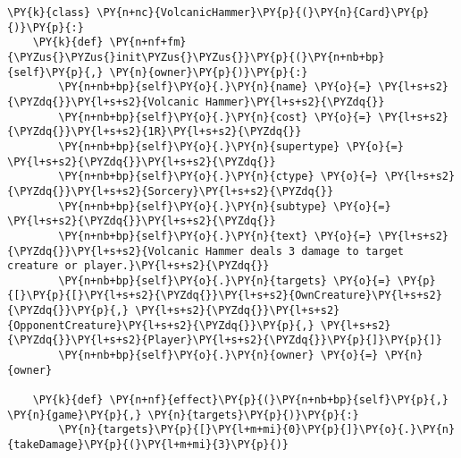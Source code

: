 \begin{Verbatim}[commandchars=\\\{\}]
\PY{k}{class} \PY{n+nc}{VolcanicHammer}\PY{p}{(}\PY{n}{Card}\PY{p}{)}\PY{p}{:}
    \PY{k}{def} \PY{n+nf+fm}{\PYZus{}\PYZus{}init\PYZus{}\PYZus{}}\PY{p}{(}\PY{n+nb+bp}{self}\PY{p}{,} \PY{n}{owner}\PY{p}{)}\PY{p}{:}
        \PY{n+nb+bp}{self}\PY{o}{.}\PY{n}{name} \PY{o}{=} \PY{l+s+s2}{\PYZdq{}}\PY{l+s+s2}{Volcanic Hammer}\PY{l+s+s2}{\PYZdq{}}
        \PY{n+nb+bp}{self}\PY{o}{.}\PY{n}{cost} \PY{o}{=} \PY{l+s+s2}{\PYZdq{}}\PY{l+s+s2}{1R}\PY{l+s+s2}{\PYZdq{}}
        \PY{n+nb+bp}{self}\PY{o}{.}\PY{n}{supertype} \PY{o}{=} \PY{l+s+s2}{\PYZdq{}}\PY{l+s+s2}{\PYZdq{}}
        \PY{n+nb+bp}{self}\PY{o}{.}\PY{n}{ctype} \PY{o}{=} \PY{l+s+s2}{\PYZdq{}}\PY{l+s+s2}{Sorcery}\PY{l+s+s2}{\PYZdq{}}
        \PY{n+nb+bp}{self}\PY{o}{.}\PY{n}{subtype} \PY{o}{=} \PY{l+s+s2}{\PYZdq{}}\PY{l+s+s2}{\PYZdq{}}
        \PY{n+nb+bp}{self}\PY{o}{.}\PY{n}{text} \PY{o}{=} \PY{l+s+s2}{\PYZdq{}}\PY{l+s+s2}{Volcanic Hammer deals 3 damage to target creature or player.}\PY{l+s+s2}{\PYZdq{}}
        \PY{n+nb+bp}{self}\PY{o}{.}\PY{n}{targets} \PY{o}{=} \PY{p}{[}\PY{p}{[}\PY{l+s+s2}{\PYZdq{}}\PY{l+s+s2}{OwnCreature}\PY{l+s+s2}{\PYZdq{}}\PY{p}{,} \PY{l+s+s2}{\PYZdq{}}\PY{l+s+s2}{OpponentCreature}\PY{l+s+s2}{\PYZdq{}}\PY{p}{,} \PY{l+s+s2}{\PYZdq{}}\PY{l+s+s2}{Player}\PY{l+s+s2}{\PYZdq{}}\PY{p}{]}\PY{p}{]}
        \PY{n+nb+bp}{self}\PY{o}{.}\PY{n}{owner} \PY{o}{=} \PY{n}{owner}

    \PY{k}{def} \PY{n+nf}{effect}\PY{p}{(}\PY{n+nb+bp}{self}\PY{p}{,} \PY{n}{game}\PY{p}{,} \PY{n}{targets}\PY{p}{)}\PY{p}{:}
        \PY{n}{targets}\PY{p}{[}\PY{l+m+mi}{0}\PY{p}{]}\PY{o}{.}\PY{n}{takeDamage}\PY{p}{(}\PY{l+m+mi}{3}\PY{p}{)}
\end{Verbatim}

